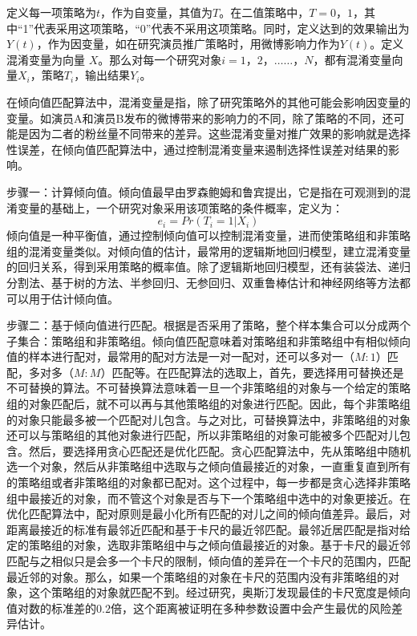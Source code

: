 定义每一项策略为$t$，作为自变量，其值为$T$。在二值策略中，$T={0，1}$，其中“1”代表采用这项策略，“0”代表不采用这项策略。同时，定义达到的效果输出为$Y(t)$，作为因变量，如在研究演员推广策略时，用微博影响力作为$Y(t)$。定义混淆变量为向量
$X$。那么对每一个研究对象$i=1，2，……，N$，都有混淆变量向量$X_i$，策略$T_i$，输出结果$Y_i$。


在倾向值匹配算法中，混淆变量是指，除了研究策略外的其他可能会影响因变量的变量。如演员A和演员B发布的微博带来的影响力的不同，除了策略的不同，还可能是因为二者的粉丝量不同带来的差异。这些混淆变量对推广效果的影响就是选择性误差，在倾向值匹配算法中，通过控制混淆变量来遏制选择性误差对结果的影响。


步骤一：计算倾向值。倾向值最早由罗森鲍姆和鲁宾提出，它是指在可观测到的混淆变量的基础上，一个研究对象采用该项策略的条件概率，定义为：
\begin{equation}e_i = Pr(T_i = 1 | X_i)\end{equation}
倾向值是一种平衡值，通过控制倾向值可以控制混淆变量，进而使策略组和非策略组的混淆变量类似。对倾向值的估计，最常用的逻辑斯地回归模型，建立混淆变量的回归关系，得到采用策略的概率值。除了逻辑斯地回归模型，还有装袋法、递归分割法、基于树的方法、半参回归、无参回归、双重鲁棒估计和神经网络等方法都可以用于估计倾向值。

步骤二：基于倾向值进行匹配。根据是否采用了策略，整个样本集合可以分成两个子集合：策略组和非策略组。倾向值匹配意味着对策略组和非策略组中有相似倾向值的样本进行配对，最常用的配对方法是一对一配对，还可以多对一（$M:1$）匹配，多对多（$M:M$）匹配等。在匹配算法的选取上，首先，要选择用可替换还是不可替换的算法。不可替换算法意味着一旦一个非策略组的对象与一个给定的策略组的对象匹配后，就不可以再与其他策略组的对象进行匹配。因此，每个非策略组的对象只能最多被一个匹配对儿包含。与之对比，可替换算法中，非策略组的对象还可以与策略组的其他对象进行匹配，所以非策略组的对象可能被多个匹配对儿包含。然后，要选择用贪心匹配还是优化匹配。贪心匹配算法中，先从策略组中随机选一个对象，然后从非策略组中选取与之倾向值最接近的对象，一直重复直到所有的策略组或者非策略组的对象都已配对。这个过程中，每一步都是贪心选择非策略组中最接近的对象，而不管这个对象是否与下一个策略组中选中的对象更接近。在优化匹配算法中，配对原则是最小化所有匹配的对儿之间的倾向值差异。最后，对距离最接近的标准有最邻近匹配和基于卡尺的最近邻匹配。最邻近居匹配是指对给定的策略组的对象，选取非策略组中与之倾向值最接近的对象。基于卡尺的最近邻匹配与之相似只是会多一个卡尺的限制，倾向值的差异在一个卡尺的范围内，匹配最近邻的对象。那么，如果一个策略组的对象在卡尺的范围内没有非策略组的对象，这个策略组的对象就匹配不到。经过研究，奥斯汀\cite{2011b}发现最佳的卡尺宽度是倾向值对数的标准差的$0.2$倍，这个距离被证明在多种参数设置中会产生最优的风险差异估计。

